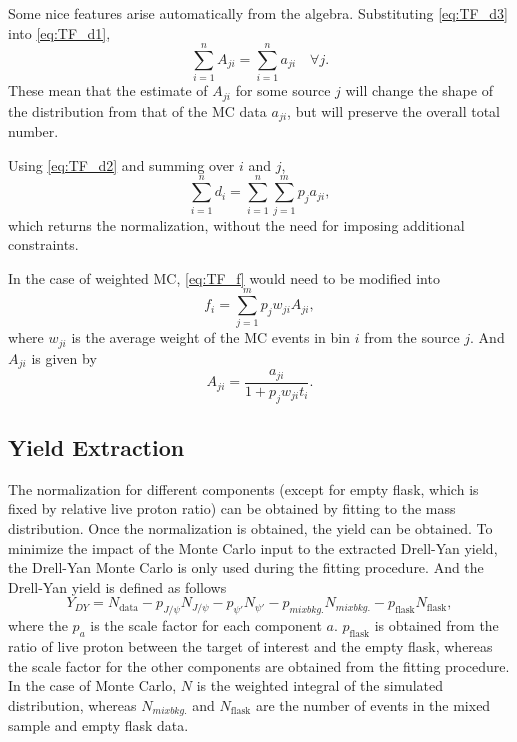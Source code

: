 \documentclass[../main.tex]{subfiles}
\begin{document}
Some nice features arise automatically from the algebra. Substituting \cref{eq:TF_d3} into \cref{eq:TF_d1},
\begin{equation}
	\sum_{i=1}^{n} A_{ji}=\sum_{i=1}^{n} a_{ji}\quad\forall j .
\end{equation}
These mean that the estimate of $A_{ji}$ for some source $j$ will change the shape of the distribution
from that of the MC data $a_{ji}$, but will preserve the overall total number.

Using \cref{eq:TF_d2} and summing over $i$ and $j$,
\begin{equation}
	\sum_{i=1}^n d_i = \sum_{i=1}^{n}\sum_{j=1}^m p_j a_{ji},
\end{equation}
which returns the normalization, without the need for imposing additional constraints.

In the case of weighted MC, \cref{eq:TF_f} would need to be modified into
\begin{equation}
	f_i = \sum^m_{j=1} p_j w_{ji}A_{ji},
\end{equation}
where $w_{ji}$ is the average weight of the MC events in bin $i$ from the source $j$.
And $A_{ji}$ is given by
\begin{equation}
	A_{ji}=\frac{a_{ji}}{1+p_j w_{ji}t_i}.
\end{equation}

\subsection{Yield Extraction}
The normalization for different components (except for empty flask, which is fixed by relative live proton ratio)
can be obtained by fitting to the mass distribution. Once the normalization is obtained, the yield can be
obtained. To minimize the impact of the Monte Carlo input to the extracted Drell-Yan yield, the Drell-Yan Monte
Carlo is only used during the fitting procedure. And the Drell-Yan yield is defined as follows
\begin{equation}
	Y_{DY}= N_{\textrm{data}}-p_{J/\psi} N_{J/\psi}-p_{\psi'} N_{\psi'}-p_{mix bkg.} N_{mix bkg.} - p_{\textrm{flask}} N_{\textrm{flask}},
\end{equation}
where the $p_a$ is the scale factor for each component $a$. $p_{\textrm{flask}}$ is obtained from the
ratio of live proton between the target of interest and the empty flask,
whereas the scale factor for the other components are obtained from the fitting procedure.
In the case of Monte Carlo, $N$ is the weighted integral of the
simulated distribution, whereas $N_{mix bkg.}$ and $N_{\textrm{flask}}$ are the number of events in the mixed
sample and empty flask data.
\end{document}
